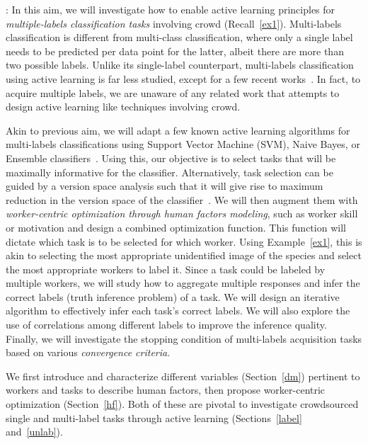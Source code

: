 \smallbreak {} : In this aim, we will investigate how to enable active learning principles for {\em multiple-labels classification tasks} involving crowd (Recall~\ref{ex1}). Multi-labels classification is different from multi-class classification,  where only  a  single  label  needs  to  be  predicted per data point for the latter, albeit there are more than two possible labels. Unlike its single-label counterpart, multi-labels classification using active learning is far less studied, except for a few recent works~\cite{multi0,multi1,multi2,multi3}. In fact, to acquire multiple labels, we are unaware of any related work that  attempts to design active learning like techniques involving crowd.  

Akin to previous aim, we will adapt a few known active learning algorithms for multi-labels classifications using Support Vector Machine (SVM), Naive Bayes, or Ensemble classifiers~\cite{multi0,multi1,multi2,multi3}. Using this, our objective is to select tasks that will be maximally
informative for the classifier. Alternatively, task selection
can be guided by a version space analysis such that it will give rise to maximum reduction in the version space of the classifier~\cite{versionspace}. We will then augment them with {\em worker-centric optimization through human factors modeling}, such as worker skill or motivation and design a combined optimization function. This function will dictate which task is to be selected for which worker. Using Example~\ref{ex1}, this is akin to selecting the most appropriate unidentified image of the species and select the most appropriate workers to label it. Since a task could be labeled by multiple workers, we will study how to aggregate multiple responses and infer the correct labels (truth inference problem) of a task. We will design an iterative
algorithm to effectively infer each task’s correct labels. We will also explore the use of correlations among different labels to improve the inference quality. Finally, we will investigate the stopping condition of multi-labels acquisition tasks based on various {\em convergence criteria}. 

We first introduce and characterize different variables (Section~\ref{dm}) pertinent to workers and tasks to describe human factors, then propose worker-centric optimization (Section~\ref{hf}). Both of these  are pivotal to investigate crowdsourced single and multi-label tasks through active learning (Sections~\ref{label} and~\ref{unlab}).



